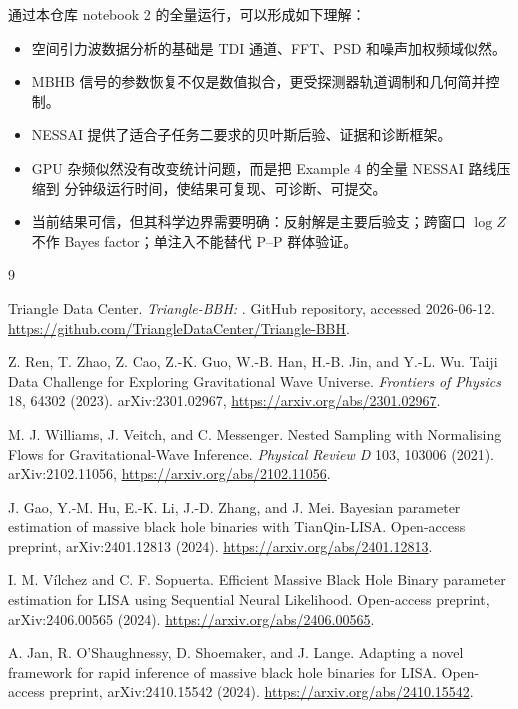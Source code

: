 \documentclass[11pt,a4paper]{ctexart}
\begin{document}
通过本仓库 notebook 2 的全量运行，可以形成如下理解：
\begin{itemize}
  \item 空间引力波数据分析的基础是 TDI 通道、FFT、PSD 和噪声加权频域似然。
  \item MBHB 信号的参数恢复不仅是数值拟合，更受探测器轨道调制和几何简并控制。
  \item NESSAI 提供了适合子任务二要求的贝叶斯后验、证据和诊断框架。
  \item GPU 杂频似然没有改变统计问题，而是把 Example 4 的全量 NESSAI 路线压缩到
  分钟级运行时间，使结果可复现、可诊断、可提交。
  \item 当前结果可信，但其科学边界需要明确：反射解是主要后验支；跨窗口
  \(\log Z\) 不作 Bayes factor；单注入不能替代 P--P 群体验证。
\end{itemize}

\begin{thebibliography}{9}

Triangle Data Center.
\newblock \emph{Triangle-BBH: }.
\newblock GitHub repository, accessed 2026-06-12.
\newblock \url{https://github.com/TriangleDataCenter/Triangle-BBH}.

Z. Ren, T. Zhao, Z. Cao, Z.-K. Guo, W.-B. Han, H.-B. Jin, and Y.-L. Wu.
\newblock Taiji Data Challenge for Exploring Gravitational Wave Universe.
\newblock \emph{Frontiers of Physics} 18, 64302 (2023).
\newblock arXiv:2301.02967, \url{https://arxiv.org/abs/2301.02967}.

M. J. Williams, J. Veitch, and C. Messenger.
\newblock Nested Sampling with Normalising Flows for Gravitational-Wave Inference.
\newblock \emph{Physical Review D} 103, 103006 (2021).
\newblock arXiv:2102.11056, \url{https://arxiv.org/abs/2102.11056}.

J. Gao, Y.-M. Hu, E.-K. Li, J.-D. Zhang, and J. Mei.
\newblock Bayesian parameter estimation of massive black hole binaries with TianQin-LISA.
\newblock Open-access preprint, arXiv:2401.12813 (2024).
\newblock \url{https://arxiv.org/abs/2401.12813}.

I. M. Vílchez and C. F. Sopuerta.
\newblock Efficient Massive Black Hole Binary parameter estimation for LISA using Sequential Neural Likelihood.
\newblock Open-access preprint, arXiv:2406.00565 (2024).
\newblock \url{https://arxiv.org/abs/2406.00565}.

A. Jan, R. O'Shaughnessy, D. Shoemaker, and J. Lange.
\newblock Adapting a novel framework for rapid inference of massive black hole binaries for LISA.
\newblock Open-access preprint, arXiv:2410.15542 (2024).
\newblock \url{https://arxiv.org/abs/2410.15542}.

\end{thebibliography}
\end{document}
